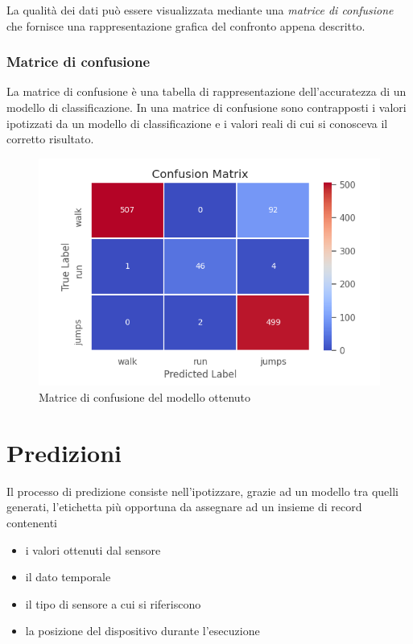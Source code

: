 La qualità dei dati può essere visualizzata mediante una \textit{matrice di confusione} che fornisce una rappresentazione 
grafica del confronto appena descritto.

\subsubsection{Matrice di confusione}
La matrice di confusione è una tabella di rappresentazione dell'accuratezza di un modello di classificazione. 
In una matrice di confusione sono contrapposti i valori ipotizzati da un modello di classificazione e i valori reali 
di cui si conosceva il corretto risultato.

\begin{figure}[H]
    \centering
    \includegraphics[scale = 0.70]{assets/images/classifications/accelerometer/right_hand/confusion-matrix-right-hand-acc.png}
    \caption{Matrice di confusione del modello ottenuto}
\end{figure}


\section{Predizioni}
Il processo di predizione consiste nell'ipotizzare, grazie ad un modello tra quelli generati, 
l'etichetta più opportuna da assegnare ad un insieme di record contenenti
\begin{itemize}
    \item i valori ottenuti dal sensore
    \item il dato temporale
    \item il tipo di sensore a cui si riferiscono
    \item la posizione del dispositivo durante l'esecuzione
\end{itemize}


